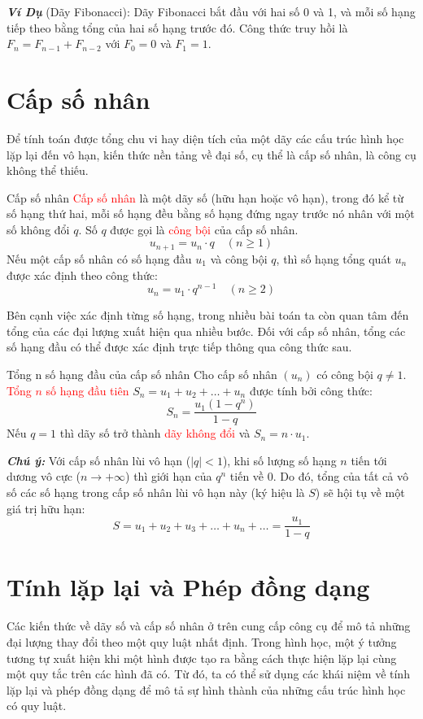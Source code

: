 \documentclass[12pt,a4paper,oneside]{book}
\theoremstyle{theorem}
\theoremstyle{definition}
\begin{document}
    \noindent \textit{\textbf{Ví Dụ}} (Dãy Fibonacci): Dãy Fibonacci bắt đầu với hai số 0 và 1, và mỗi số hạng tiếp theo bằng tổng của hai số hạng trước đó. Công thức truy hồi là $F_n = F_{n-1} + F_{n-2}$ với $F_0 = 0$ và $F_1 = 1$.
    \section{Cấp số nhân}
    Để tính toán được tổng chu vi hay diện tích của một dãy các cấu trúc hình học lặp lại đến vô hạn, kiến thức nền tảng về đại số, cụ thể là cấp số nhân, là công cụ không thể thiếu.

\begin{khung}{Cấp số nhân}
 \textcolor{red} {Cấp số nhân} là một dãy số (hữu hạn hoặc vô hạn), trong đó kể từ số hạng thứ hai, mỗi số hạng đều bằng số hạng đứng ngay trước nó nhân với một số không đổi $q$. Số $q$ được gọi là \textcolor{red} {công bội} của cấp số nhân.
\[
u_{n+1} = u_n \cdot q \quad (n \ge 1)
\]
Nếu một cấp số nhân có số hạng đầu $u_1$ và công bội $q$, thì số hạng tổng quát $u_n$ được xác định theo công thức:
\[
u_n = u_1 \cdot q^{n-1} \quad (n \ge 2)
\]
\end{khung}
    \noindent Bên cạnh việc xác định từng số hạng, trong nhiều bài toán ta còn quan tâm đến tổng của các đại lượng xuất hiện qua nhiều bước. Đối với cấp số nhân, tổng các số hạng đầu có thể được xác định trực tiếp thông qua công thức sau.
    \begin{khung}{Tổng n số hạng đầu của cấp số nhân}
    Cho cấp số nhân $(u_n)$ có công bội $q \neq 1$. \textcolor{red} {Tổng $n$ số hạng đầu tiên} $S_n = u_1 + u_2 + \dots + u_n$ được tính bởi công thức:
    \[
    S_n = \frac{u_1(1 - q^n)}{1 - q}
    \]
    Nếu $q = 1$ thì dãy số trở thành \textcolor{red} {dãy không đổi} và $S_n = n \cdot u_1$.
    \end{khung}

    \noindent \textit{\textbf{Chú ý:}} Với cấp số nhân lùi vô hạn ($|q| < 1$), khi số lượng số hạng $n$ tiến tới dương vô cực ($n \to +\infty$) thì giới hạn của $q^n$ tiến về $0$. Do đó, tổng của tất cả vô số các số hạng trong cấp số nhân lùi vô hạn này (ký hiệu là $S$) sẽ hội tụ về một giá trị hữu hạn:
    \[
    S = u_1 + u_2 + u_3 + \dots + u_n + \dots = \frac{u_1}{1 - q}
    \]
\section{Tính lặp lại và Phép đồng dạng}
    \noindent Các kiến thức về dãy số và cấp số nhân ở trên cung cấp công cụ để mô tả những đại lượng thay đổi theo một quy luật nhất định. Trong hình học, một ý tưởng tương tự xuất hiện khi một hình được tạo ra bằng cách thực hiện lặp lại cùng một quy tắc trên các hình đã có. Từ đó, ta có thể sử dụng các khái niệm về tính lặp lại và phép đồng dạng để mô tả sự hình thành của những cấu trúc hình học có quy luật.
    
\end{document}

